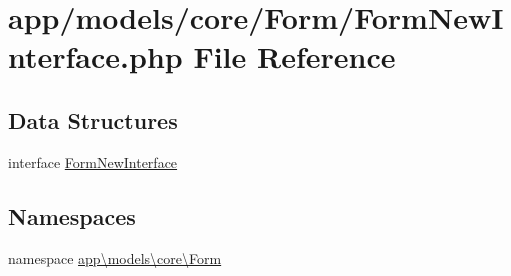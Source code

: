 \hypertarget{_form_new_interface_8php}{\section{app/models/core/\-Form/\-Form\-New\-Interface.php File Reference}
\label{_form_new_interface_8php}
}
\subsection*{Data Structures}
\begin{DoxyCompactItemize}
\item 
interface \hyperlink{interfaceapp_1_1models_1_1core_1_1_form_1_1_form_new_interface}{Form\-New\-Interface}
\end{DoxyCompactItemize}
\subsection*{Namespaces}
\begin{DoxyCompactItemize}
\item 
namespace \hyperlink{namespaceapp_1_1models_1_1core_1_1_form}{app\textbackslash{}models\textbackslash{}core\textbackslash{}\-Form}
\end{DoxyCompactItemize}
